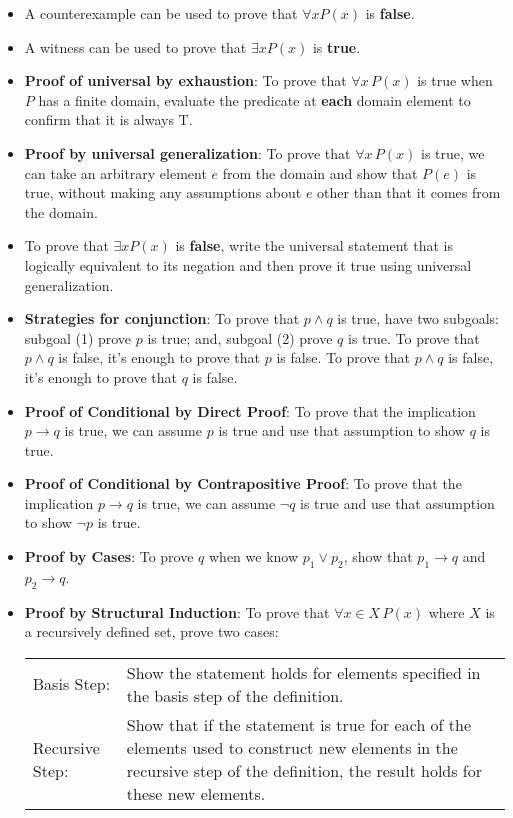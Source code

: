 \begin{itemize}
    \item A counterexample can be used to prove that  $\forall x P(x)$ is {\bf false}.
    \item  A witness can be used  to  prove that  $\exists x P(x)$ is {\bf true}.
    \item {\bf Proof of universal by exhaustion}: To prove that $\forall x \, P(x)$
is true when $P$ has a finite domain, evaluate the predicate at {\bf each} domain element to confirm that it is always T.
    \item  {\bf Proof by universal generalization}: To prove that $\forall x \, P(x)$
is true, we can take an arbitrary element $e$ from the domain and show that $P(e)$ is true, without making any assumptions about $e$ other than that it comes from the domain.
    \item To  prove  that $\exists x P(x)$ is {\bf false}, write the universal statement that is logically equivalent to its negation and then prove it true using universal generalization.
    \item {\bf Strategies for conjunction}: To prove that $p \land q$ is true, have two subgoals: subgoal (1) prove $p$ 
is  true; and, subgoal (2) prove $q$ is true. To prove that $p \land q$ is false, it's enough to prove that $p$ is false.
 To prove that $p \land q$ is false, it's enough to prove that $q$ is false.
    \item {\bf Proof of Conditional by Direct Proof}: To prove that the implication $p \to q$ is true, we can assume $p$ is true and use that assumption to show $q$ is true.
    \item {\bf Proof of Conditional by Contrapositive Proof}: To prove that the implication $p \to q$ is true, we can assume $\neg q$ is true and use that assumption to show $\neg p$ is true.
    \item {\bf Proof by Cases}: To prove $q$ when we know $p_1 \lor p_2$, show that $p_1 \to q$ and $p_2 \to q$.
    \item
    {\bf Proof by Structural Induction}: To prove that $\forall x \in X \, P(x)$ where $X$ is a recursively defined set, prove two cases:
        
        \begin{tabularx}{\textwidth}{l X}
        Basis Step: & Show the statement holds for elements specified in the basis step of the definition. \\
        Recursive Step: & Show that if the statement is true for each of the elements used to construct
    new elements in the recursive step of the definition, the result holds for these new elements.
    \end{tabularx}
    

\end{itemize}
